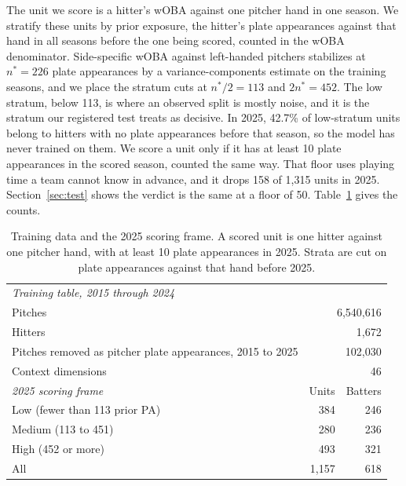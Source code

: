 \documentclass[11pt,letterpaper]{article}
\begin{document}
The unit we score is a hitter's wOBA against one pitcher hand in one season. We stratify these units by prior exposure, the hitter's plate appearances against that hand in all seasons before the one being scored, counted in the wOBA denominator. Side-specific wOBA against left-handed pitchers stabilizes at $n^* = 226$ plate appearances by a variance-components estimate on the training seasons, and we place the stratum cuts at $n^*/2 = 113$ and $2n^* = 452$. The low stratum, below 113, is where an observed split is mostly noise, and it is the stratum our registered test treats as decisive. In 2025, 42.7\% of low-stratum units belong to hitters with no plate appearances before that season, so the model has never trained on them. We score a unit only if it has at least 10 plate appearances in the scored season, counted the same way. That floor uses playing time a team cannot know in advance, and it drops 158 of 1,315 units in 2025. Section~\ref{sec:test} shows the verdict is the same at a floor of 50. Table~\ref{tab:data} gives the counts.

\begin{table}[t]
\centering
\caption{Training data and the 2025 scoring frame. A scored unit is one hitter against one pitcher hand, with at least 10 plate appearances in 2025. Strata are cut on plate appearances against that hand before 2025.}
\label{tab:data}
\begin{tabular}{lrr}
\toprule
\multicolumn{3}{l}{\textit{Training table, 2015 through 2024}} \\
Pitches & \multicolumn{2}{r}{6,540,616} \\
Hitters & \multicolumn{2}{r}{1,672} \\
Pitches removed as pitcher plate appearances, 2015 to 2025 & \multicolumn{2}{r}{102,030} \\
Context dimensions & \multicolumn{2}{r}{46} \\
\midrule
\textit{2025 scoring frame} & Units & Batters \\
Low (fewer than 113 prior PA) & 384 & 246 \\
Medium (113 to 451) & 280 & 236 \\
High (452 or more) & 493 & 321 \\
All & 1,157 & 618 \\
\bottomrule
\end{tabular}
\end{table}
\end{document}
